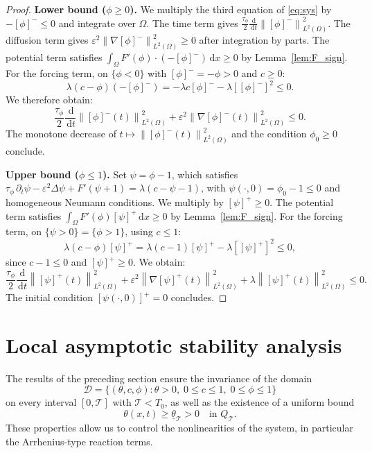 \documentclass[final,1p,times]{elsarticle}
\newcommand{\dx}{\,\mathrm{d}x}
\numberwithin{equation}{section}
\newcommand{\dd}{\,\mathrm{d}}
\newcommand{\dt}{\,\mathrm{d}t}
\newcommand{\norm}[1]{\left\|#1\right\|}
\newcommand{\ppos}[1]{\left[#1\right]^{+}}
\newcommand{\pneg}[1]{\left[#1\right]^{-}}
\newcommand{\ptn}{\partial_t}
\begin{document}
	\begin{proof}
		\textbf{Lower bound ($\phi \geq 0$).}
		We multiply the third equation of \eqref{eq:sys} by $-\pneg{\phi} \leq 0$ and integrate
		over $\Omega$. The time term gives $\frac{\tau_\phi}{2}\frac{\dd}{\dt}\norm{\pneg{\phi}}_{L^2(\Omega)}^2$.
		The diffusion term gives $\varepsilon^2\norm{\nabla\pneg{\phi}}_{L^2(\Omega)}^2 \geq 0$ after
		integration by parts. The potential term satisfies
		$\int_\Omega F'(\phi)\cdot(-\pneg{\phi})\dx \geq 0$ by Lemma~\ref{lem:F_sign}. For the
		forcing term, on $\{\phi < 0\}$ with $\pneg{\phi} = -\phi > 0$ and $c \geq 0$:
		\[
		\lambda(c-\phi)(-\pneg{\phi})
		= -\lambda c\pneg{\phi} - \lambda[\pneg{\phi}]^2 \leq 0.
		\]
		We therefore obtain:
		\[
		\frac{\tau_\phi}{2}\frac{\dd}{\dt}\norm{\pneg{\phi}(t)}_{L^2(\Omega)}^2
		+ \varepsilon^2\norm{\nabla\pneg{\phi}(t)}_{L^2(\Omega)}^2 \leq 0.
		\]
		The monotone decrease of $t \mapsto \norm{\pneg{\phi}(t)}_{L^2(\Omega)}^2$ and the condition
		$\phi_0 \geq 0$ conclude.
		
		\textbf{Upper bound ($\phi \leq 1$).}
		Set $\psi = \phi - 1$, which satisfies
		$\tau_\phi\,\ptn\psi - \varepsilon^2\Delta\psi + F'(\psi+1) = \lambda(c-\psi-1)$,
		with $\psi(\cdot,0) = \phi_0 - 1 \leq 0$ and homogeneous Neumann conditions. We multiply by
		$\ppos{\psi} \geq 0$. The potential term satisfies
		$\int_\Omega F'(\phi)\ppos{\psi}\dx \geq 0$ by Lemma~\ref{lem:F_sign}. For the
		forcing term, on $\{\psi > 0\} = \{\phi > 1\}$, using $c \leq 1$:
		\[
		\lambda(c-\phi)\ppos{\psi}
		= \lambda(c-1)\ppos{\psi} - \lambda[\ppos{\psi}]^2 \leq 0,
		\]
		since $c - 1 \leq 0$ and $\ppos{\psi} \geq 0$. We obtain:
		\[
		\frac{\tau_\phi}{2}\frac{\dd}{\dt}\norm{\ppos{\psi}(t)}_{L^2(\Omega)}^2
		+ \varepsilon^2\norm{\nabla\ppos{\psi}(t)}_{L^2(\Omega)}^2
		+ \lambda\norm{\ppos{\psi}(t)}_{L^2(\Omega)}^2 \leq 0.
		\]
		The initial condition $\ppos{\psi(\cdot,0)} = 0$ concludes.
	\end{proof}
	
	
	
	
	\section{Local asymptotic stability analysis}
	\label{sec:stab}
	
	The results of the preceding section ensure the invariance of the domain
	\[
	\mathcal{D} = \{ (\theta,c,\phi) : \theta>0,\; 0\le c\le 1,\; 0\le \phi\le 1 \}
	\]
	on every interval $[0,\mathcal{T}]$ with $\mathcal{T}<T_0$, as well as the existence of a uniform bound
	\[
	\theta(x,t) \ge \underline{\theta}_\mathcal{T} > 0 \quad \text{in } Q_{\mathcal{T}}.
	\]
	These properties allow us to control the nonlinearities of the system, in particular the Arrhenius-type reaction terms.
	
\end{document}
